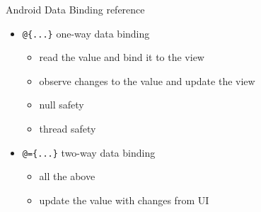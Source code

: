 \begin{frame}[fragile]{Android Data Binding reference}
\begin{itemize}
  \item<+-> \lstinline`@{...}` one-way data binding
    \begin{itemize}
      \item<+-> read the value and bind it to the view
      \item<+-> observe changes to the value and update the view
      \item<+-> null safety
      \item<+-> thread safety
    \end{itemize}
  \item<+-> \lstinline`@={...}` two-way data binding
    \begin{itemize}
      \item<+-> all the above
      \item<+-> update the value with changes from UI
    \end{itemize}
\end{itemize}
\end{frame}
